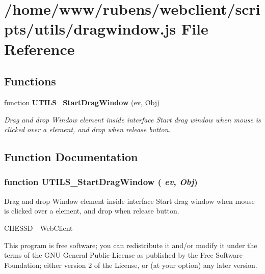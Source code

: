 \section{/home/www/rubens/webclient/scripts/utils/dragwindow.js File Reference}
\label{dragwindow_8js}
\subsection*{Functions}
\begin{CompactItemize}
\item 
function {\bf UTILS\_\-StartDragWindow} (ev, Obj)
\begin{CompactList}\small\item\em Drag and drop Window element inside interface Start drag window when mouse is clicked over a element, and drop when release button. \item\end{CompactList}\end{CompactItemize}


\subsection{Function Documentation}
\subsubsection[UTILS\_\-StartDragWindow]{\setlength{\rightskip}{0pt plus 5cm}function UTILS\_\-StartDragWindow ( {\em ev}, \/   {\em Obj})}\label{dragwindow_8js_936119f257d49c89f33d5e50e71bf48f}


Drag and drop Window element inside interface Start drag window when mouse is clicked over a element, and drop when release button. 

CHESSD - WebClient

This program is free software; you can redistribute it and/or modify it under the terms of the GNU General Public License as published by the Free Software Foundation; either version 2 of the License, or (at your option) any later version.

